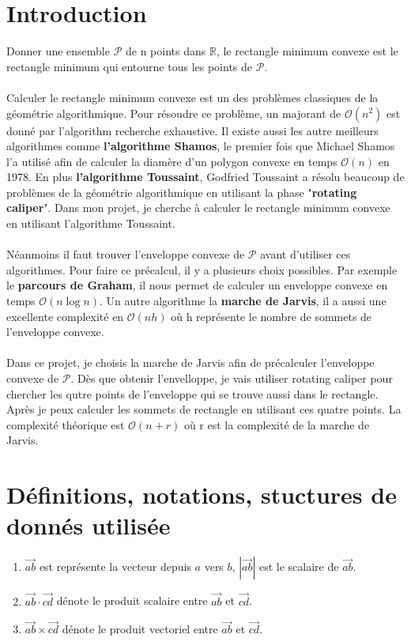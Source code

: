 \documentclass[14px]{article}
\begin{document}
\section{Introduction}
Donner une ensemble $\mathcal{P}$ de n points dans $\mathbb{R}$, le rectangle minimum convexe est le rectangle minimum qui entourne tous les points de $\mathcal{P}$.\\\\
Calculer le rectangle minimum convexe est un des problèmes classiques de la géométrie algorithmique. Pour résoudre ce problème, un majorant de $\mathcal{O}(n^2)$ est donné par l'algorithm recherche exhaustive. Il existe aussi les autre meilleurs algorithmes comme \textbf{l'algorithme Shamos}, le premier fois que Michael Shamos l'a utilisé afin de calculer la diamère d’un polygon convexe en temps $\mathcal{O}(n)$ en 1978. En plus \textbf{l'algorithme Toussaint}, Godfried Toussaint a résolu beaucoup de problèmes de la géométrie algorithmique en utilisant la phase "\textbf{rotating caliper}". Dans mon projet, je cherche à calculer le rectangle minimum convexe en utilisant l'algorithme Toussaint.\\\\
Néanmoins il faut trouver l'enveloppe convexe de $\mathcal{P}$ avant d'utiliser ces algorithmes. Pour faire ce précalcul, il y a plusieurs choix possibles. Par exemple le \textbf{parcours de Graham}, il nous permet de calculer un enveloppe convexe en temps $\mathcal{O}(n\log n)$. Un autre algorithme la \textbf{marche de Jarvis}, il a aussi une excellente complexité en $\mathcal{O}(nh)$ où h représente le nombre de sommets de l'enveloppe convexe. \\\\
Dans ce projet, je choisis la marche de Jarvis afin de précalculer l'enveloppe convexe de $\mathcal{P}$. Dès que obtenir l'envelloppe, je vais utiliser rotating caliper pour chercher les qutre points de l'enveloppe qui se trouve aussi dans le rectangle. Après je peux calculer les sommets de rectangle en utilisant ces quatre points. La complexité théorique est $\mathcal{O}(n + r)$ où r est la complexité de la marche de Jarvis.
\clearpage

\section{Définitions, notations, stuctures de donnés utilisée}

\begin{enumerate}
	\item $\overrightarrow{ab}$ est représente la vecteur depuis $a$ vers $b$, $|\overrightarrow{ab}|$ est le scalaire de $\overrightarrow{ab}$.
	\item $\overrightarrow{ab}\cdot\overrightarrow{cd}$ dénote le produit scalaire entre $\vec{ab}$ et $\vec{cd}$.
	\item $\overrightarrow{ab}\times\overrightarrow{cd}$ dénote le produit vectoriel entre $\overrightarrow{ab}$ et $\overrightarrow{cd}$.
\end{enumerate}
\end{document}
